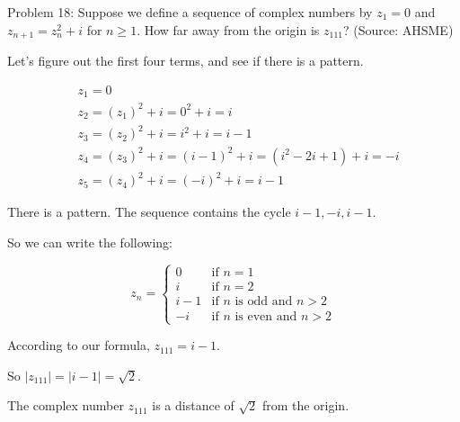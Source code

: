 Problem 18: Suppose we define a sequence of complex numbers by $z_1 = 0$ and $z_{n + 1} = z_n^2 + i$ for $n \ge 1$. How far away from the origin is $z_{111}$? (Source: AHSME)

Let's figure out the first four terms, and see if there is a pattern.

\begin{align*}
& z_1 = 0 \\
& z_2 = (z_{1})^2 + i = 0^2 + i = i \\
& z_3 = (z_{2})^2 + i = i^2 + i = i - 1 \\
& z_4 = (z_{3})^2 + i = (i - 1)^2 + i = (i^2 - 2i + 1) + i = -i \\
& z_5 = (z_4)^2 + i = (-i)^2 + i = i - 1
\end{align*}

There is a pattern. The sequence contains the cycle $i - 1, -i, i - 1$.

So we can write the following:

\[
z_{n} = 
\begin{cases}
0 & \text{if $n = 1$} \\
i & \text{if $n = 2$} \\
i - 1 & \text{if $n$ is odd and $n > 2$} \\
-i & \text{if $n$ is even and $n > 2$}
\end{cases}
\]

According to our formula, $z_{111} = i - 1$.

So $|z_{111}| = |i - 1| = \sqrt{2}$.

The complex number $z_{111}$ is a distance of $\boxed{\sqrt{2}}$ from the origin.
